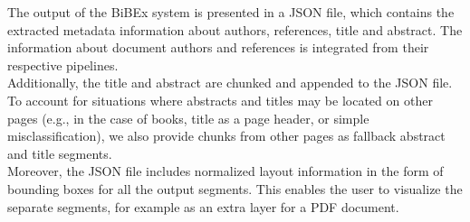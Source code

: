 The output of the BiBEx system is presented in a JSON file, which contains the extracted metadata information about authors, references, title and abstract. The information about document authors and references is integrated from their respective pipelines.\\
Additionally, the title and abstract are chunked and appended to the JSON file. To account for situations where abstracts and titles may be located on other pages (e.g., in the case of books, title as a page header, or simple misclassification), we also provide chunks from other pages as fallback abstract and title segments.\\
Moreover, the JSON file includes normalized layout information in the form of bounding boxes for all the output segments. This enables the user to visualize the separate segments, for example as an extra layer for a PDF document.
